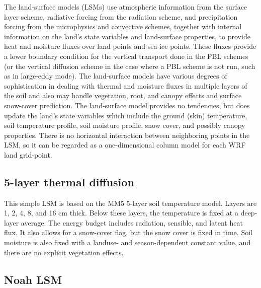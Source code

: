 The land-surface models (LSMs) use atmospheric information from the surface layer scheme, 
radiative forcing from the radiation scheme, and precipitation forcing from the 
microphysics and convective schemes, together with internal information on the 
land's state variables and land-surface properties, to provide heat and moisture 
fluxes over land points and sea-ice points. These fluxes provide a lower boundary 
condition for the vertical transport done in the PBL schemes (or the vertical 
diffusion scheme in the case where a PBL scheme is not run, such as in 
large-eddy mode). The land-surface 
models have various degrees of sophistication in dealing with thermal and moisture 
fluxes in multiple layers of the soil and also may handle vegetation, root, and 
canopy effects and surface snow-cover prediction. The land-surface model provides 
no tendencies, but does update the land's state variables which include the ground (skin) 
temperature, soil temperature profile, soil moisture profile, snow cover, and 
possibly canopy properties. There is no horizontal interaction between neighboring
points in the LSM, so it can be regarded as a one-dimensional column model for
each WRF land grid-point.

\subsection{5-layer thermal diffusion}

This simple LSM is based on the MM5 5-layer soil temperature model. Layers are 
1, 2, 4, 8, and 16 cm thick. Below these layers, the temperature is fixed at a
deep-layer average. The energy budget includes radiation, sensible, and 
latent heat flux. It also allows for a snow-cover flag, but the snow 
cover is fixed in time. Soil moisture is also fixed with a landuse- and 
season-dependent constant value, and there are no explicit vegetation effects.

\subsection{Noah LSM}


